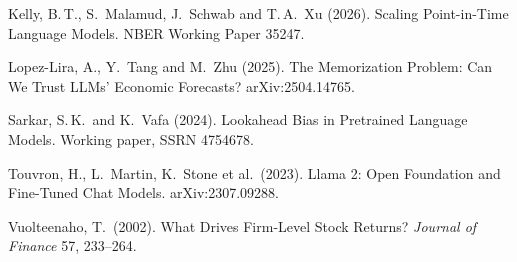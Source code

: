 \documentclass[11pt,letterpaper]{article}
\theoremstyle{remark}
\begin{document}
\begin{enumerate}[label={[\arabic*]},leftmargin=*]
\item Kelly, B.\,T., S.\ Malamud, J.\ Schwab and T.\,A.\ Xu (2026). Scaling Point-in-Time Language Models.
NBER Working Paper 35247.



\item Lopez-Lira, A., Y.\ Tang and M.\ Zhu (2025). The Memorization Problem: Can We Trust LLMs' Economic Forecasts?
arXiv:2504.14765.

\item Sarkar, S.\,K.\ and K.\ Vafa (2024). Lookahead Bias in Pretrained Language Models.
Working paper, SSRN 4754678.



\item Touvron, H., L.\ Martin, K.\ Stone et al.\ (2023). Llama 2: Open Foundation and Fine-Tuned Chat Models.
arXiv:2307.09288.

\item Vuolteenaho, T.\ (2002). What Drives Firm-Level Stock Returns?
\emph{Journal of Finance} 57, 233--264.

\end{enumerate}
\end{document}
